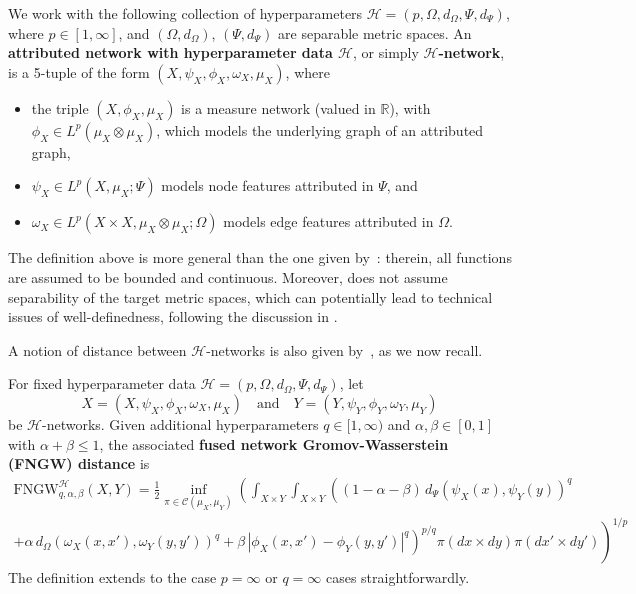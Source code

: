 \documentclass[twoside,11pt]{article}
\theoremstyle{definition}
\newcommand{\R}{\mathbb{R}}
\newcommand{\define}[1]{\textbf{#1}}
\begin{document}
\begin{definition}\label{def:attributed_network}
    We work with the following collection of hyperparameters $\mathcal{H} = (p,\Omega,d_\Omega,\Psi,d_\Psi)$, where $p \in [1,\infty]$, and $(\Omega,d_\Omega)$, $(\Psi,d_\Psi)$ are separable metric spaces. An \define{attributed network with hyperparameter data $\mathcal{H}$}, or simply \define{$\mathcal{H}$-network}, is a 5-tuple of the form $(X,\psi_X,\phi_X,\omega_X,\mu_X)$, where
    \begin{itemize}
        \item the triple $(X,\phi_X,\mu_X)$ is a measure network (valued in $\R$), with $\phi_X \in L^p(\mu_X\otimes \mu_X)$, which models the underlying graph of an attributed graph,
        \item $\psi_X \in L^p(X,\mu_X; \Psi)$ models node features attributed in $\Psi$, and 
        \item $\omega_X \in L^p(X \times X, \mu_X \otimes \mu_X; \Omega)$ models edge features attributed in $\Omega$.
    \end{itemize}
\end{definition}

\begin{remark}
    The definition above is more general than the one given by~\citet[Definition 2.1]{yang2023exploiting}: therein, all functions are assumed to be bounded and continuous. Moreover, \citet{yang2023exploiting} does not assume separability of the target metric spaces, which can potentially lead to technical issues of well-definedness, following the discussion in .
\end{remark}

A notion of distance between $\mathcal{H}$-networks is also given by~\citet{yang2023exploiting}, as we now recall.

\begin{definition}\label{def:fused_network_GW}
    For fixed hyperparameter data $\mathcal{H} = (p,\Omega,d_\Omega,\Psi,d_\Psi)$, let  
    \[
    X = (X,\psi_X,\phi_X,\omega_X,\mu_X)\quad  \mbox{and}\quad  Y = (Y,\psi_Y,\phi_Y,\omega_Y,\mu_Y)
    \]
    be $\mathcal{H}$-networks. Given additional hyperparameters $q \in [1,\infty)$ and $\alpha,\beta \in [0,1]$ with $\alpha + \beta \leq 1$, the associated \define{fused network Gromov-Wasserstein (FNGW) distance} is 
    \begin{multline}\label{eqn:fused_network_GW}
        \mathrm{FNGW}^\mathcal{H}_{q,\alpha,\beta}(X,Y) = \frac{1}{2} \inf_{\pi \in \mathcal{C}(\mu_X,\mu_Y)} \left(\int_{X \times Y} \int_{X \times Y} \left((1-\alpha-\beta)\,d_\Psi(\psi_X(x),\psi_Y(y))^q \right.\right. \\
        \left.\left. + \alpha \, d_\Omega(\omega_X(x,x'),\omega_Y(y,y'))^q + \beta \,|\phi_X(x,x') - \phi_Y(y,y')|^q\right)^{p/q} \pi(dx \times dy) \pi(dx' \times dy')\right)^{1/p}
    \end{multline}
    The definition extends to the case $p=\infty$ or $q=\infty$ cases straightforwardly.
\end{definition}
\end{document}
